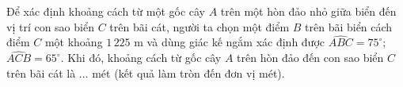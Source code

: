 \begin{ex}%
	Để xác định khoảng cách từ một gốc cây $A$ trên một hòn đảo nhỏ giữa biển đến vị trí con sao biển $C$ trên bãi cát, người ta chọn một điểm $B$ trên bãi biển cách điểm $C$ một khoảng $1\,225$ m và dùng giác kế ngắm xác định được $\widehat{ABC}=75^\circ$; $\widehat{ACB}=65^\circ$. Khi đó, khoảng cách từ gốc cây $A$ trên hòn đảo đến con sao biển $C$ trên bãi cát là $\ldots$ mét (kết quả làm tròn đến đơn vị mét).

\end{ex}
